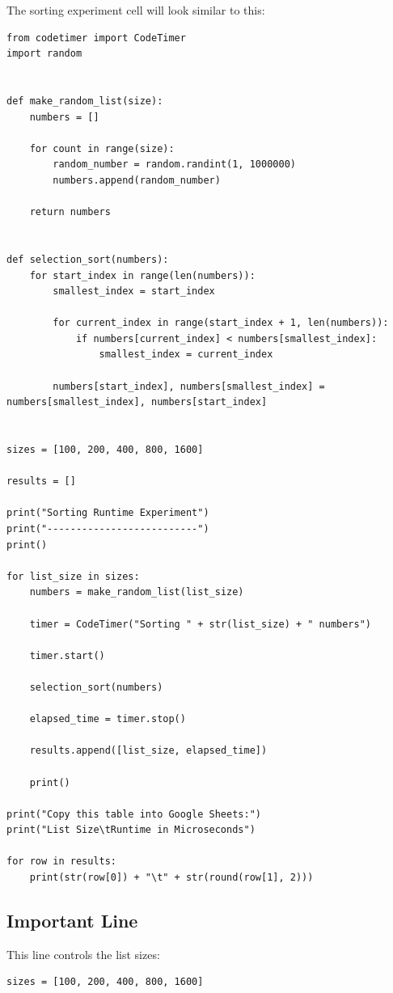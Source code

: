 \documentclass[11pt]{article}
\begin{document}
The sorting experiment cell will look similar to this:

\begin{lstlisting}[style=pythonstyle]
from codetimer import CodeTimer
import random


def make_random_list(size):
    numbers = []

    for count in range(size):
        random_number = random.randint(1, 1000000)
        numbers.append(random_number)

    return numbers


def selection_sort(numbers):
    for start_index in range(len(numbers)):
        smallest_index = start_index

        for current_index in range(start_index + 1, len(numbers)):
            if numbers[current_index] < numbers[smallest_index]:
                smallest_index = current_index

        numbers[start_index], numbers[smallest_index] = numbers[smallest_index], numbers[start_index]


sizes = [100, 200, 400, 800, 1600]

results = []

print("Sorting Runtime Experiment")
print("--------------------------")
print()

for list_size in sizes:
    numbers = make_random_list(list_size)

    timer = CodeTimer("Sorting " + str(list_size) + " numbers")

    timer.start()

    selection_sort(numbers)

    elapsed_time = timer.stop()

    results.append([list_size, elapsed_time])

    print()

print("Copy this table into Google Sheets:")
print("List Size\tRuntime in Microseconds")

for row in results:
    print(str(row[0]) + "\t" + str(round(row[1], 2)))
\end{lstlisting}

\subsection*{Important Line}

This line controls the list sizes:

\begin{lstlisting}[style=pythonstyle]
sizes = [100, 200, 400, 800, 1600]
\end{lstlisting}
\end{document}
